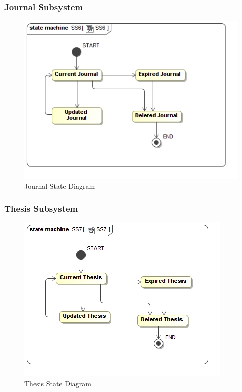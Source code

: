 \documentclass{article}
\begin{document}
			\subsubsection{Journal Subsystem}
				\begin{figure}
					\includegraphics[width=\textwidth]{5.4-SS5-7/SS6}
					\caption{Journal State Diagram}
				\end{figure}
			\subsubsection{Thesis Subsystem}
				\begin{figure}
					\includegraphics[width=\textwidth]{5.4-SS5-7/SS7}
					\caption{Thesis State Diagram}
				\end{figure}
\end{document}
